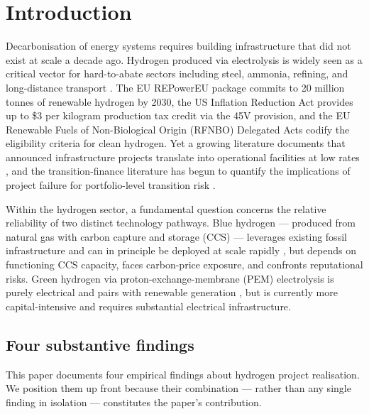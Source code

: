 \documentclass[11pt,a4paper]{article}
\begin{document}
\newpage

\section{Introduction}

Decarbonisation of energy systems requires building infrastructure that did not exist at scale a decade ago. Hydrogen produced via electrolysis is widely seen as a critical vector for hard-to-abate sectors including steel, ammonia, refining, and long-distance transport \citep{IEA2023, GlenkReichelstein2019}. The EU REPowerEU package \citep{EC2022REPowerEU} commits to 20 million tonnes of renewable hydrogen by 2030, the US Inflation Reduction Act \citep{IRA2022} provides up to \$3 per kilogram production tax credit via the 45V provision, and the EU Renewable Fuels of Non-Biological Origin (RFNBO) Delegated Acts \citep{EC2023RFNBO} codify the eligibility criteria for clean hydrogen. Yet a growing literature documents that announced infrastructure projects translate into operational facilities at low rates \citep{Flyvbjerg2014}, and the transition-finance literature has begun to quantify the implications of project failure for portfolio-level transition risk \citep{Mercure2018, BoltonKacperczyk2021, Caldecott2018}.

Within the hydrogen sector, a fundamental question concerns the relative reliability of two distinct technology pathways. Blue hydrogen --- produced from natural gas with carbon capture and storage (CCS) --- leverages existing fossil infrastructure and can in principle be deployed at scale rapidly \citep{Bui2018, Budinis2018}, but depends on functioning CCS capacity, faces carbon-price exposure, and confronts reputational risks. Green hydrogen via proton-exchange-membrane (PEM) electrolysis is purely electrical and pairs with renewable generation \citep{GlenkReichelstein2019}, but is currently more capital-intensive and requires substantial electrical infrastructure.

\subsection{Four substantive findings}

This paper documents four empirical findings about hydrogen project realisation. We position them up front because their combination --- rather than any single finding in isolation --- constitutes the paper's contribution.
\end{document}
